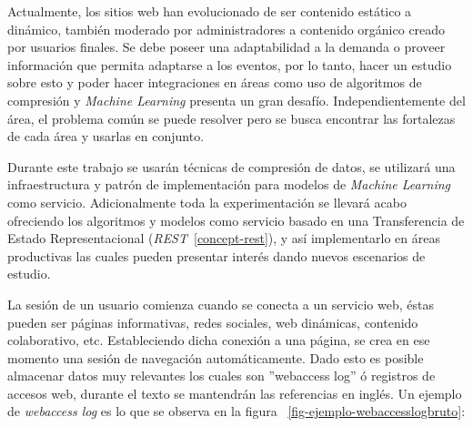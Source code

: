   Actualmente, los sitios web han evolucionado de ser contenido estático a dinámico, también moderado por administradores a contenido orgánico creado por usuarios finales. Se debe poseer una adaptabilidad a la demanda o proveer información que permita adaptarse a los eventos, por lo tanto, hacer un estudio sobre esto y poder hacer integraciones en áreas como uso de algoritmos de compresión y \emph{Machine Learning} presenta un gran desafío. Independientemente del área, el problema común  se puede resolver pero se busca encontrar las fortalezas de cada área y usarlas en conjunto. 

  Durante este trabajo se usarán técnicas de compresión de datos, se utilizará una infraestructura y patrón de implementación para modelos de \emph{Machine Learning} como servicio. Adicionalmente toda la experimentación se llevará acabo ofreciendo los algoritmos y modelos como servicio basado en una Transferencia de Estado Representacional (\emph{REST}~\ref{concept-rest}), y así implementarlo en áreas productivas las cuales pueden presentar interés dando nuevos escenarios de estudio.


  La sesión de un usuario comienza cuando se conecta a un servicio web, éstas pueden ser páginas informativas, redes sociales, web dinámicas, contenido colaborativo, etc. Estableciendo dicha conexión a una página, se crea en ese momento una sesión de navegación automáticamente. Dado esto es posible almacenar datos muy relevantes los cuales son ''webaccess log'' ó registros de accesos web, durante el texto se mantendrán las referencias en inglés. Un ejemplo de \emph{webaccess log} es lo que se observa en la figura ~\ref{fig-ejemplo-webaccesslogbruto}:

